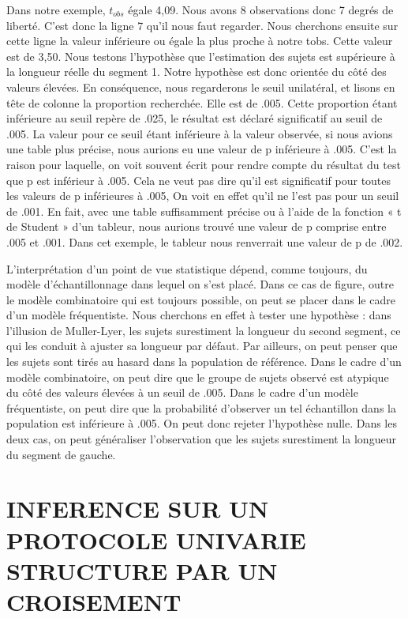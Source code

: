 \documentclass[]{book}
\theoremstyle{definition}
\theoremstyle{definition}
\theoremstyle{definition}
\theoremstyle{remark}
\begin{document}
Dans notre exemple, \(t_{obs}\) égale 4,09. Nous avons 8 observations
donc 7 degrés de liberté. C'est donc la ligne 7 qu'il nous faut
regarder. Nous cherchons ensuite sur cette ligne la valeur inférieure ou
égale la plus proche à notre tobs. Cette valeur est de 3,50. Nous
testons l'hypothèse que l'estimation des sujets est supérieure à la
longueur réelle du segment 1. Notre hypothèse est donc orientée du côté
des valeurs élevées. En conséquence, nous regarderons le seuil
unilatéral, et lisons en tête de colonne la proportion recherchée. Elle
est de .005. Cette proportion étant inférieure au seuil repère de .025,
le résultat est déclaré significatif au seuil de .005. La valeur pour ce
seuil étant inférieure à la valeur observée, si nous avions une table
plus précise, nous aurions eu une valeur de p inférieure à .005. C'est
la raison pour laquelle, on voit souvent écrit pour rendre compte du
résultat du test que p est inférieur à .005. Cela ne veut pas dire qu'il
est significatif pour toutes les valeurs de p inférieures à .005, On
voit en effet qu'il ne l'est pas pour un seuil de .001. En fait, avec
une table suffisamment précise ou à l'aide de la fonction « t de Student
» d'un tableur, nous aurions trouvé une valeur de p comprise entre .005
et .001. Dans cet exemple, le tableur nous renverrait une valeur de p de
.002.

L'interprétation d'un point de vue statistique dépend, comme toujours,
du modèle d'échantillonnage dans lequel on s'est placé. Dans ce cas de
figure, outre le modèle combinatoire qui est toujours possible, on peut
se placer dans le cadre d'un modèle fréquentiste. Nous cherchons en
effet à tester une hypothèse : dans l'illusion de Muller-Lyer, les
sujets surestiment la longueur du second segment, ce qui les conduit à
ajuster sa longueur par défaut. Par ailleurs, on peut penser que les
sujets sont tirés au hasard dans la population de référence. Dans le
cadre d'un modèle combinatoire, on peut dire que le groupe de sujets
observé est atypique du côté des valeurs élevées à un seuil de .005.
Dans le cadre d'un modèle fréquentiste, on peut dire que la probabilité
d'observer un tel échantillon dans la population est inférieure à .005.
On peut donc rejeter l'hypothèse nulle. Dans les deux cas, on peut
généraliser l'observation que les sujets surestiment la longueur du
segment de gauche.

\hypertarget{inference-sur-un-protocole-univarie-structure-par-un-croisement}{%
\chapter{INFERENCE SUR UN PROTOCOLE UNIVARIE STRUCTURE PAR UN
CROISEMENT}\label{inference-sur-un-protocole-univarie-structure-par-un-croisement}}
\end{document}
